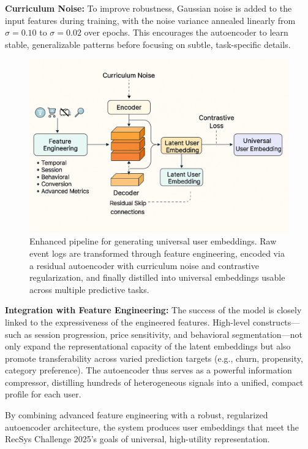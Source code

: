 \documentclass[sigconf]{acmart}
\begin{document}
\textbf{Curriculum Noise:}  
To improve robustness, Gaussian noise is added to the input features during training, with the noise variance annealed linearly from $\sigma=0.10$ to $\sigma=0.02$ over epochs. This encourages the autoencoder to learn stable, generalizable patterns before focusing on subtle, task-specific details.

\begin{figure}[htb!]
  \centering
  \includegraphics[width=0.9\linewidth]{detail.png}
  \caption{Enhanced pipeline for generating universal user embeddings. Raw event logs are transformed through feature engineering, encoded via a residual autoencoder with curriculum noise and contrastive regularization, and finally distilled into universal embeddings usable across multiple predictive tasks.}
  \label{fig:architecture}
\end{figure}

\textbf{Integration with Feature Engineering:}  
The success of the model is closely linked to the expressiveness of the engineered features. High-level constructs—such as session progression, price sensitivity, and behavioral segmentation—not only expand the representational capacity of the latent embeddings but also promote transferability across varied prediction targets (e.g., churn, propensity, category preference). The autoencoder thus serves as a powerful information compressor, distilling hundreds of heterogeneous signals into a unified, compact profile for each user.

By combining advanced feature engineering with a robust, regularized autoencoder architecture, the system produces user embeddings that meet the RecSys Challenge 2025’s goals of universal, high-utility representation.
\end{document}
